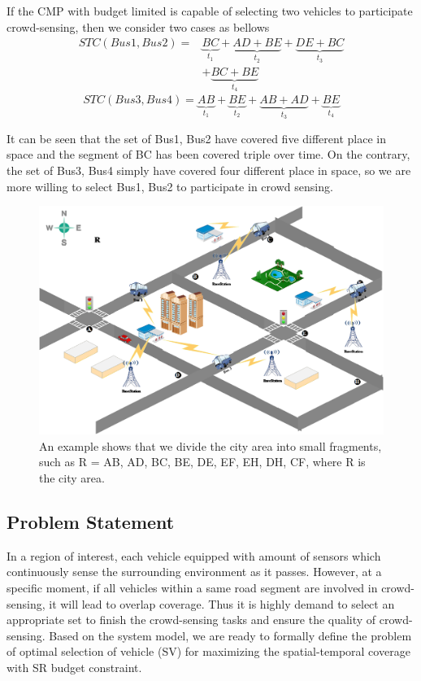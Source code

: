 \documentclass[journal]{IEEEtran}
\begin{document}
If the CMP with budget limited is capable of selecting two vehicles to participate crowd-sensing, then we consider two cases as bellows
\begin{equation}
\begin{aligned}
STC({Bus1,Bus2})=& \underset{t_{1}}{\underbrace{BC}}+\underset{t_{2}}{\underbrace{AD+BE}}+\underset{t_{3}}{\underbrace{DE+BC}}\\&+\underset{t_{4}}{\underbrace{BC+BE}}
\end{aligned}
\end{equation}
\begin{equation}
STC({Bus3,Bus4})= \underset{t_{1}}{\underbrace{AB}}+\underset{t_{2}}{\underbrace{BE}}+\underset{t_{3}}{\underbrace{AB+AD}}+\underset{t_{4}}{\underbrace{BE}}
\end{equation}

 It can be seen that the set of {Bus1, Bus2} have covered five different place in space and the segment of {BC} has been covered triple over time. On the contrary, the set of {Bus3, Bus4} simply have covered four different place in space, so we are more willing to select {Bus1, Bus2} to participate in crowd sensing.
 \begin{figure}[t]
 	\centering
 	\includegraphics[width=1\linewidth]{Fig2.png}
 	\caption{An example shows that we divide the city area into small fragments, such as R = {AB, AD, BC, BE, DE, EF, EH, DH, CF}, where R is the city area.}
 	\label{fig:figure4}
 \end{figure}	
 \subsection{Problem Statement} 
  In a region of interest, each vehicle equipped with amount of sensors which continuously sense the surrounding environment as it passes. However, at a specific moment, if all vehicles within a same road segment are involved in crowd-sensing, it will lead to overlap coverage. Thus it is highly demand to select an appropriate set to finish the crowd-sensing tasks and ensure the quality of crowd-sensing. Based on the system model, we are ready to formally define the problem of optimal selection of vehicle (SV) for maximizing the spatial-temporal coverage with SR budget constraint.	
  
\end{document}
